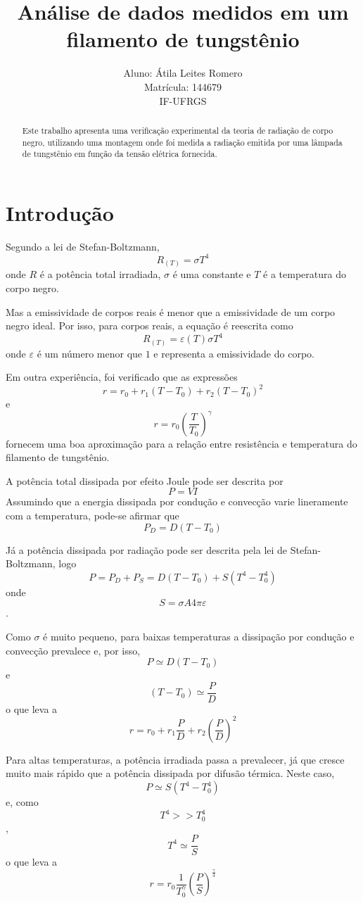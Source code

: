 \documentclass[brazilian,12pt,a4paper,final]{article}
\title{Análise de dados medidos em um filamento de tungstênio}
\author{Aluno: Átila Leites Romero \\ Matrícula: 144679 \\ IF-UFRGS}
\begin{document}
\maketitle

\begin{abstract}
Este trabalho apresenta uma verificação experimental da teoria de radiação de corpo negro, 
utilizando uma montagem onde foi medida a radiação emitida por uma lâmpada de tungstênio 
em função da tensão elétrica fornecida.
\end{abstract}

\section{Introdução}
Segundo a lei de Stefan-Boltzmann,
$$ R_{(T)}=\sigma T^4$$
onde $R$ é a potência total irradiada, $\sigma$ é uma constante 
e $T$ é a temperatura do corpo negro. 

Mas a emissividade de corpos reais é menor que a emissividade de um corpo negro ideal.
Por isso, para corpos reais, a equação é reescrita como 
$$ R_{(T)}=\varepsilon (T)\sigma T^4$$
onde $\varepsilon$ é um número menor que $1$ e representa a emissividade do corpo.

Em outra experiência, foi verificado que as expressões
$$r=r_0+r_1(T-T_0)+r_2(T-T_0)^2$$ 
e 
$$r=r_0(\frac{T}{T_0})^\gamma$$
fornecem uma boa aproximação para a
relação entre resistência e temperatura do filamento de tungstênio.

A potência total dissipada por efeito Joule pode ser descrita por 
$$P=VI$$ 
Assumindo que a energia dissipada por condução e convecção varie lineramente 
com a temperatura, pode-se afirmar que 
$$P_D=D(T-T_0)$$

Já a potência dissipada por radiação pode ser descrita pela lei de Stefan-Boltzmann, 
logo 
$$P=P_D+P_S=D(T-T_0)+S(T^4-T_0^4)$$
onde 
$$S=\sigma A 4\pi\varepsilon$$.

Como $\sigma$ é muito pequeno, 
para baixas temperaturas a dissipação por condução e convecção prevalece e,
por isso, 
$$P\simeq D(T-T_0)$$ 
e 
$$(T-T_0)\simeq \frac{P}{D}$$
o que leva a 
$$r=r_0+r_1\frac{P}{D}+r_2(\frac{P}{D})^2$$

Para altas temperaturas, a potência irradiada passa a prevalecer, 
já que cresce muito mais rápido que a potência dissipada por difusão térmica.
Neste caso,  
$$P\simeq S(T^4-T_0^4)$$ 
e, como 
$$T^4>>T_0^4$$, 
$$T^4\simeq \frac{P}{S}$$
o que leva a 
$$r=r_0\frac{1}{T_0^\gamma}(\frac{P}{S})^\frac{\gamma}{4}$$
\end{document}
